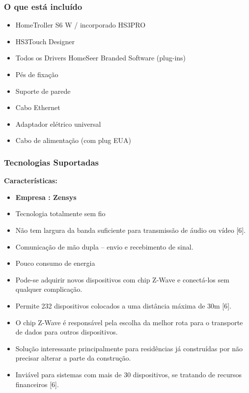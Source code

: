 \subsubsection{O que está incluído}
\begin{itemize}
\item HomeTroller  S6 W / incorporado HS3PRO
\item HS3Touch Designer
\item Todos os Drivers HomeSeer Branded Software (plug-ins)
\item Pés de fixação
\item Suporte de parede
\item Cabo Ethernet
\item Adaptador elétrico universal
\item Cabo de alimentação (com plug EUA)
\end{itemize}

\subsubsection{Tecnologias Suportadas}

\textbf{Características:}
\begin{itemize}
\item \textbf{Empresa : Zensys}
\item Tecnologia totalmente sem fio
\item Não tem largura da banda suficiente para transmissão de áudio ou vídeo [6].
\item Comunicação de mão dupla – envio e recebimento de sinal.
\item Pouco consumo de energia
\item Pode-se adquirir novos dispositivos com chip Z-Wave e conectá-los sem qualquer complicação.
\item Permite 232 dispositivos colocados a uma distância máxima de 30m [6].
\item O chip Z-Wave é responsável pela escolha da melhor rota para o transporte de dados para outros dispositivos.
\item Solução interessante principalmente para residências já construídas por não precisar alterar a parte da construção.
\item Inviável para sistemas com mais de 30 dispositivos, se tratando de recursos financeiros [6].
\end{itemize}

